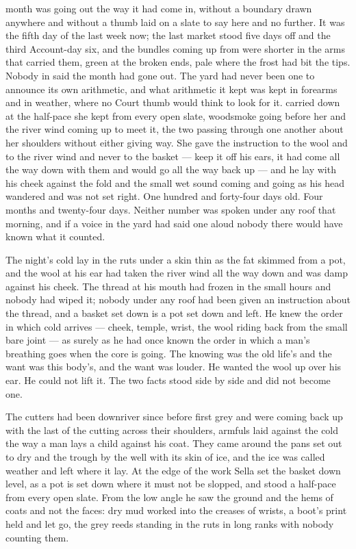 
 month was going out the way it had come in, without a boundary drawn anywhere and without a thumb laid on a slate to say here and no further. It was the fifth day of the last week now; the last market stood five days off and the third Account-day six, and the bundles coming up from  were shorter in the arms that carried them, green at the broken ends, pale where the frost had bit the tips. Nobody in  said the month had gone out. The yard had never been one to announce its own arithmetic, and what arithmetic it kept was kept in forearms and in weather, where no Court thumb would think to look for it.  carried  down at the half-pace she kept from every open slate, woodsmoke going before her and the river wind coming up to meet it, the two passing through one another about her shoulders without either giving way. She gave the instruction to the wool and to the river wind and never to the basket --- keep it off his ears, it had come all the way down with them and would go all the way back up --- and he lay with his cheek against the fold and the small wet sound coming and going as his head wandered and was not set right. One hundred and forty-four days old. Four months and twenty-four days. Neither number was spoken under any roof that morning, and if a voice in the yard had said one aloud nobody there would have known what it counted.

The night's cold lay in the ruts under a skin thin as the fat skimmed from a pot, and the wool at his ear had taken the river wind all the way down and was damp against his cheek. The thread at his mouth had frozen in the small hours and nobody had wiped it; nobody under any roof had been given an instruction about the thread, and a basket set down is a pot set down and left. He knew the order in which cold arrives --- cheek, temple, wrist, the wool riding back from the small bare joint --- as surely as he had once known the order in which a man's breathing goes when the core is going. The knowing was the old life's and the want was this body's, and the want was louder. He wanted the wool up over his ear. He could not lift it. The two facts stood side by side and did not become one.

The cutters had been downriver since before first grey and were coming back up with the last of the cutting across their shoulders, armfuls laid against the cold the way a man lays a child against his coat. They came around the pans set out to dry and the trough by the well with its skin of ice, and the ice was called weather and left where it lay. At the edge of the work Sella set the basket down level, as a pot is set down where it must not be slopped, and stood a half-pace from every open slate. From the low angle he saw the ground and the hems of coats and not the faces: dry mud worked into the creases of wrists, a boot's print held and let go, the grey reeds standing in the ruts in long ranks with nobody counting them.

